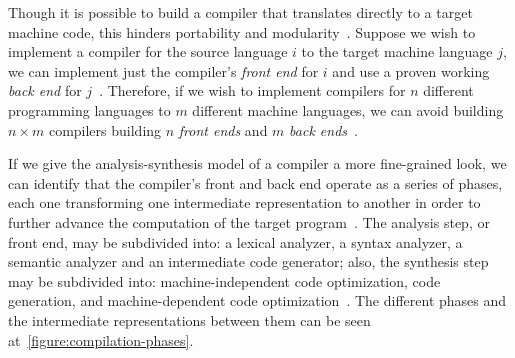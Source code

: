 \documentclass[
  oneside,
  english,
  coorientadorbanca,
  noabntexcite
]{ufsc-thesis-rn46-2019}
\begin{document}
Though it is possible to build a compiler that translates directly to a target machine code, this hinders portability and modularity~\cite{appel2003modern}.
Suppose we wish to implement a compiler for the source language $i$ to the target machine language $j$, we can implement just the compiler's \textit{front end} for $i$ and use a proven working \textit{back end} for $j$~\cite{Aho:2006:CPT:1177220}.
Therefore, if we wish to implement compilers for $n$ different programming languages to $m$ different machine languages, we can avoid building $n \times m$ compilers building $n$ \textit{front ends} and $m$ \textit{back ends}~\cite{Aho:2006:CPT:1177220}.

If we give the analysis-synthesis model of a compiler a more fine-grained look, we can identify that the compiler's front and back end operate as a series of phases, each one transforming one intermediate representation to another in order to further advance the computation of the target program~\cite{Aho:2006:CPT:1177220}.
The analysis step, or front end, may be subdivided into: a lexical analyzer, a syntax analyzer, a semantic analyzer and an intermediate code generator; also, the synthesis step may be subdivided into: machine-independent code optimization, code generation, and machine-dependent code optimization~\cite{Aho:2006:CPT:1177220}.
The different phases and the intermediate representations between them can be seen at~\cref{figure:compilation-phases}.
\end{document}
